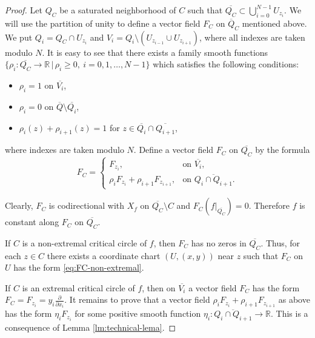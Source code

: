 \documentclass[10pt,a4paper]{amsart}
\newcommand{\bbR}{\mathbb{R}}
\begin{document}
\begin{proof}
Let $Q_C$ be a saturated neighborhood of $C$ such that $\overline{Q_C}\subset \bigcup_{i = 0}^{N-1} U_{z_i}.$ We will use the partition of unity to define a  vector field $F_C$ on $\overline{Q}_C$ mentioned above.
We put $Q_i = Q_C\cap U_{z_i}$ and $V_i = Q_i\setminus (U_{z_{i-1}}\cup U_{z_{i+1}})$, where all indexes are taken modulo $N$. It is easy to see that there exists a family smooth functions $\{ \rho_i:\overline{Q_C}\to \bbR\,|\, \rho_i\geq 0,\ i =0,1,\ldots, N-1 \}$
which satisfies the following conditions:
\begin{itemize}
	\item $\rho_i = 1$ on $\overline{V_i}$,
	\item $\rho_i = 0$ on $\overline{Q}\setminus \overline{Q_{i}}$,
	\item $\rho_i(z) + \rho_{i+1}(z) = 1$ for $z\in \overline{Q_i}\cap \overline{Q_{i+1}}$,
\end{itemize}
where  indexes are taken modulo $N$. Define a vector field $F_C$ on $\overline{Q_C}$ by the formula
\begin{equation}\label{eq:F_C-formula}
	F_C =\begin{cases}
		F_{z_i}, &\text{on }\overline{V_i},\\
		\rho_iF_{z_i}+\rho_{i+1} F_{z_{i+1}}, &\text{on } \overline{Q_i\cap Q_{i+1}}.
	\end{cases}
\end{equation}








Clearly, $F_C$ is codirectional with $X_f$ on $\overline{Q_C}\setminus C$ and $F_C(f|_{\overline{Q_C}}) = 0$. Therefore $f$ is constant along $F_C$ on $\overline{Q_C}$.



If $C$ is a non-extremal critical circle of $f$, then $F_C$ has no zeros in $\overline{Q_C}$. Thus,  for each $z\in C$ there exists a coordinate chart $(U, (x,y))$ near $z$ such that $F_C$ on $U$ has the form \eqref{eq:FC-non-extremal}.


{If $C$ is an extremal critical circle of $f$, then on $\overline{V_i}$ a vector field $F_C$ has the form $F_C = F_{z_i} = y_i\frac{\partial}{\partial x_i}$. It remains to prove that a vector field 
$\rho_iF_{z_i}+\rho_{i+1} F_{z_{i+1}}$ as above has the form $\eta_{i} F_{z_{i}}$ for some positive smooth function $\eta_{i}:\overline{Q_i\cap Q_{i+1}}\to \bbR$. This is a consequence of  Lemma \ref{lm:technical-lema}.

}
\end{proof}
\end{document}
